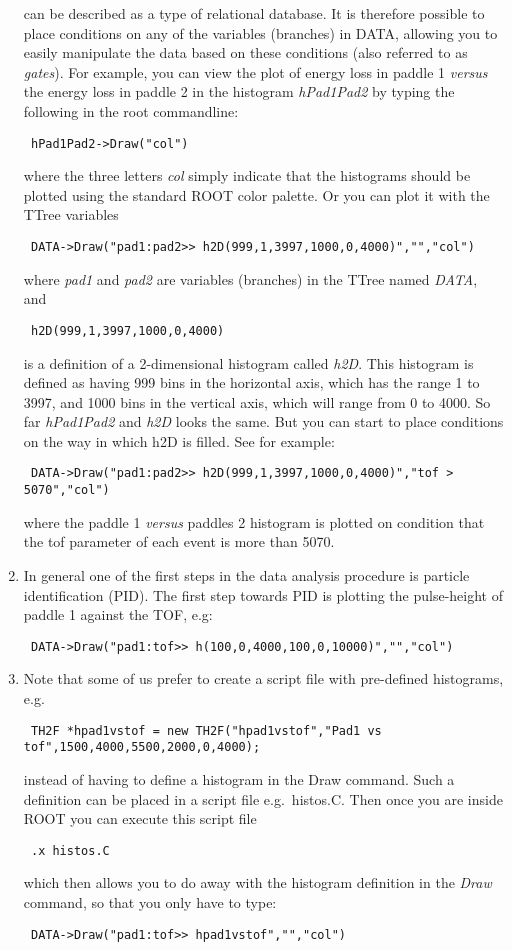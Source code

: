 \documentclass[11pt]{report}
\begin{document}
\begin{enumerate}
can be described as a type of relational database. It is therefore possible to place conditions
on any of the variables (branches) in DATA, allowing you to easily manipulate the data based
on these conditions (also referred to as {\it gates}).
For example, you can view the plot of energy loss in paddle 1 {\it versus} the energy loss in paddle 2
in the histogram {\it hPad1Pad2} by typing the following in the root commandline:
\begin{verbatim} hPad1Pad2->Draw("col") \end{verbatim}
where the three letters {\it col} simply indicate that the histograms should be plotted using the
standard ROOT color palette.
Or you can plot it with the TTree variables
\begin{verbatim} DATA->Draw("pad1:pad2>> h2D(999,1,3997,1000,0,4000)","","col")  \end{verbatim}
where {\it pad1} and {\it pad2} are variables (branches) in the TTree named {\it DATA}, and
\begin{verbatim} h2D(999,1,3997,1000,0,4000)   \end{verbatim}
is a definition of a 2-dimensional histogram called {\it h2D}. 
This histogram is defined as having 999 bins in the horizontal axis, which has the range 1 to 3997,
and 1000 bins in the vertical axis, which will range from 0 to 4000.
So far {\it hPad1Pad2} and {\it h2D} looks the same. But you can start to place conditions on the way in which
h2D is filled. See for example:
\begin{verbatim} DATA->Draw("pad1:pad2>> h2D(999,1,3997,1000,0,4000)","tof > 5070","col")  \end{verbatim}
where the paddle 1 {\it versus} paddles 2 histogram is plotted on condition that the tof parameter
of each event is more than 5070.

\item In general one of the first steps in the data analysis procedure is particle identification (PID). 
The first step towards PID is plotting the pulse-height of paddle 1 against the TOF, e.g:
\begin{verbatim} DATA->Draw("pad1:tof>> h(100,0,4000,100,0,10000)","","col")  \end{verbatim}

\item Note that some of us prefer to create a script file with pre-defined histograms, e.g.
\begin{verbatim} TH2F *hpad1vstof = new TH2F("hpad1vstof","Pad1 vs tof",1500,4000,5500,2000,0,4000);  \end{verbatim}
instead of having to define a histogram in the Draw command.
Such a definition can be placed in a script file e.g.~histos.C.
Then once you are inside ROOT you can execute this script file
\begin{verbatim} .x histos.C  \end{verbatim}
which then allows you to do away with the histogram definition in the {\it Draw} command, so that you only
have to type:
\begin{verbatim} DATA->Draw("pad1:tof>> hpad1vstof","","col") \end{verbatim}


\end{enumerate}
\end{document}
